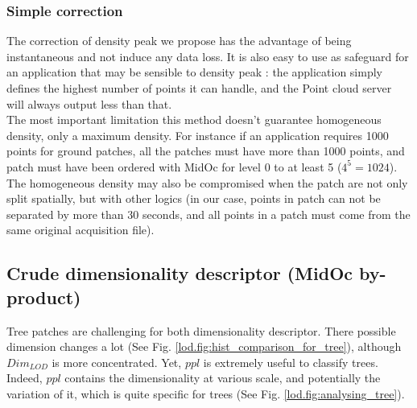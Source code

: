 		\subsubsection{Simple correction}
		The correction of density peak we propose has the advantage of being instantaneous and not induce any data loss.
		It is also easy to use as safeguard for an application that may be sensible to density peak : the application simply defines the highest number of points \per \cubic \meter it can handle, and the Point cloud server will always output less than that.
		\\
		The most important limitation this method doesn't guarantee homogeneous density, only a maximum density.
		For instance if an application requires 1000 points \per \cubic \meter for ground patches, all the patches must have more than 1000 points, and patch must have been ordered with MidOc for level 0 to at least 5 ($4^5=1024$). 
		The homogeneous density may also be compromised when the patch are not only split spatially, but with other logics (in our case, points in patch can not be separated by more than 30 seconds, and all points in a patch must come from the same original acquisition file).
		
	\subsection{Crude dimensionality descriptor (MidOc by-product)}	 
		
		Tree patches are challenging for both dimensionality descriptor.
		There possible dimension changes a lot (See Fig. \ref{lod.fig:hist_comparison_for_tree}), although $Dim_{LOD}$ is more concentrated.
		Yet, $ppl$ is extremely useful to classify trees.
		Indeed, $ppl$ contains the dimensionality at various scale, and potentially the variation of it, which is quite specific for trees (See Fig. \ref{lod.fig:analysing_tree}).
		  
			
